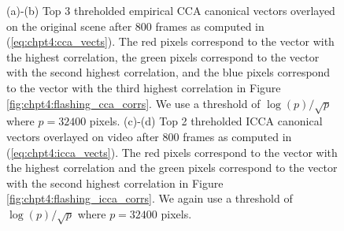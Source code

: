 \begin{figure}
  \begin{center}
    \caption{(a)-(b) Top 3 threholded empirical CCA canonical vectors overlayed on the
      original scene after 800 frames as computed in (\ref{eq:chpt4:cca_vects}). The red
      pixels correspond to the vector with the highest correlation, the green pixels
      correspond to the vector with the second highest correlation, and the blue pixels
      correspond to the vector with the third highest correlation in Figure
      \ref{fig:chpt4:flashing_cca_corrs}. We use a threshold of $\log(p)/\sqrt{p}$ where
      $p=32400$ pixels. (c)-(d) Top 2 threholded ICCA canonical vectors overlayed on video
      after 800 frames as computed in (\ref{eq:chpt4:icca_vects}). The red pixels
      correspond to the vector with the highest correlation and the green pixels
      correspond to the vector with the second highest correlation in Figure
      \ref{fig:chpt4:flashing_icca_corrs}. We again use a threshold of $\log(p)/\sqrt{p}$
      where $p=32400$ pixels.}
    \label{fig:chpt4:flashing_cca}
  \end{center}
\end{figure}

